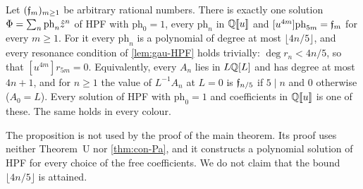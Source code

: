 
\begin{prop}
\label{prop:con-deg}
Let $(\mathfrak{f}_m)_{m\geq1}$ be arbitrary rational numbers. There is exactly one solution $\Phi=\sum_n\mathrm{ph}_n\hat{z}^n$ of HPF with $\mathrm{ph}_0=1$, every $\mathrm{ph}_n$ in $\mathbb{Q}[\![ u ]\!]$ and $[u^{4m}]\mathrm{ph}_{5m}=\mathfrak{f}_m$ for every $m\geq1$. For it every $\mathrm{ph}_n$ is a polynomial of degree at most $\lfloor4n/5\rfloor$, and every resonance condition of \cref{lem:gau-HPF} holds trivially: $\deg r_n<4n/5$, so that $[u^{4m}]r_{5m}=0$. Equivalently, every $A_n$ lies in $L\mathbb{Q}[L]$ and has degree at most $4n+1$, and for $n\geq1$ the value of $L^{-1}A_n$ at $L=0$ is $\mathfrak{f}_{n/5}$ if $5\mid n$ and $0$ otherwise ($A_0=L$). Every solution of HPF with $\mathrm{ph}_0=1$ and coefficients in $\mathbb{Q}[\![ u ]\!]$ is one of these. The same holds in every colour.
\end{prop}

The proposition is not used by the proof of the main theorem. Its proof uses neither Theorem~U nor \cref{thm:con-Pa}, and it constructs a polynomial solution of HPF for every choice of the free coefficients. We do not claim that the bound $\lfloor4n/5\rfloor$ is attained.

